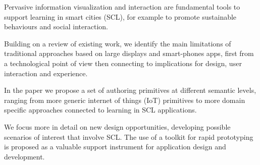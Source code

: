 Pervasive information visualization and interaction are fundamental tools to support learning in smart cities (SCL), for example to promote sustainable behaviours and social interaction. 

Building on a review of existing work, we identify the main limitations of traditional approaches based on large displays and smart-phones apps, first from a technological point of view then connecting to implications for design, user interaction and experience.

In the paper we propose a set of authoring primitives at different semantic levels, ranging from more generic internet of things (IoT) primitives to more domain specific approaches connected to learning in SCL applications.

We focus more in detail on new design opportunities, developing possible scenarios of interest that involve SCL. The use of a toolkit for rapid prototyping is proposed as a valuable support instrument for application design and development.
